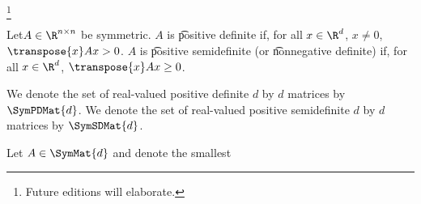 
\footnote{Future editions will elaborate.}


Let$A \in \R^{n \times n}$ be symmetric.
$A$ is \t{positive definite} if, for all $x \in \R^{d}$, $x \neq 0$, $\transpose{x}Ax > 0$.
$A$ is \t{positive semidefinite} (or \t{nonnegative definite}) if, for all $x \in \R^{d}$, $\transpose{x}Ax \geq 0$.


We denote the set of real-valued positive definite $d$ by $d$ matrices by $\SymPDMat{d}$.
We denote the set of real-valued positive semidefinite $d$ by $d$ matrices by $\SymSDMat{d}$.


\begin{proposition}
	Let $A \in \SymMat{d}$ and denote the smallest
\end{proposition}

\blankpage
